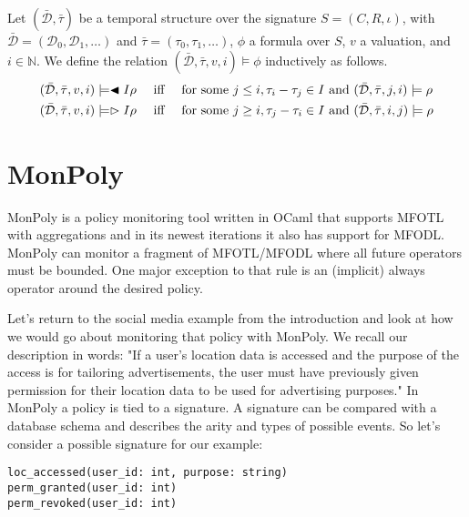 \begin{definition}
    Let $(\bar{\mathcal{D}}, \bar{\tau})$ be a temporal structure over the signature $S = (C,R,\iota)$, with $\bar{\mathcal{D}} = (\mathcal{D}_0,\mathcal{D}_1,\dots)$ and $\bar{\tau} = (\tau_0, \tau_1, \dots)$, $\phi$ a formula over $S$, $v$ a valuation, and $i \in \mathbb{N}$.
    We define the relation $(\bar{\mathcal{D}},\bar{\tau},v,i) \models \phi$ inductively as follows.
    \begin{alignat*}{3}
        &(\bar{\mathcal{D}},\bar{\tau},v,i) \models \blacktriangleleft{I} \rho
            &&\text{ iff } && \text{for some } j \leq i, \tau_i - \tau_j \in I \text{ and }(\bar{\mathcal{D}}, \bar{\tau}, j, i) \models \rho \\
        &(\bar{\mathcal{D}},\bar{\tau},v,i) \models \vartriangleright{I} \rho
            &&\text{ iff } && \text{for some } j \geq i, \tau_j - \tau_i \in I \text{ and }(\bar{\mathcal{D}}, \bar{\tau}, i, j) \models \rho \\
    \end{alignat*}
    
\end{definition}


\section{MonPoly}
MonPoly \cite{Basin2017} is a policy monitoring tool written in OCaml that supports MFOTL with aggregations and in its newest iterations it also has support for MFODL.
MonPoly can monitor a fragment of MFOTL/MFODL where all future operators must be bounded.
One major exception to that rule is an (implicit) always operator around the desired policy.

Let's return to the social media example from the introduction and look at how we would go about monitoring that policy with MonPoly.
We recall our description in words:
    "If a user's location data is accessed and the purpose of the access is for tailoring advertisements, the user must have previously given permission for their location data to be used for advertising purposes."
In MonPoly a policy is tied to a signature.
A signature can be compared with a database schema and describes the arity and types of possible events.
So let's consider a possible signature for our example: 

\begin{verbatim}
loc_accessed(user_id: int, purpose: string)
perm_granted(user_id: int)
perm_revoked(user_id: int)
\end{verbatim}

